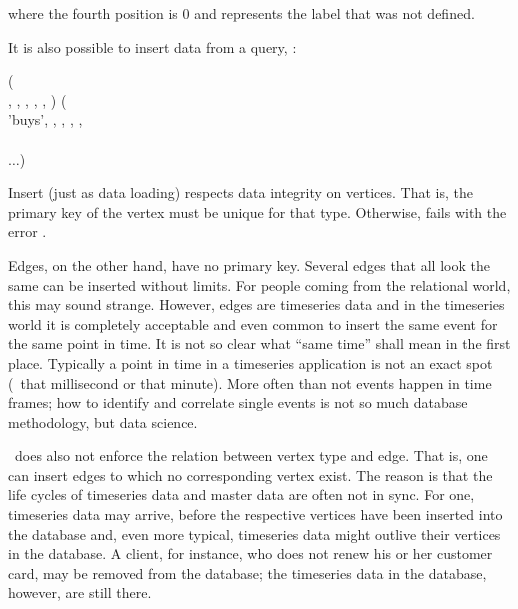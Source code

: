 where the fourth position is 0 and represents
the label that was not defined.

It is also possible  to insert data from
a query, \eg:

\begin{minipage}{\textwidth}
  ( \\
                      ,
                      ,
                      ,
                      ,
                      ,
                      ) (\\
\hspace*{0.2cm} 'buys', , 
                         ,
                         ,
                         ,
                          \\
\hspace*{0.35cm}  \\
\hspace*{0.2cm} $\dots$)
\end{minipage}

Insert (just as data loading) respects data integrity
on vertices. That is, the primary key of the vertex
must be unique for that type. Otherwise, 
fails with the error .

Edges, on the other hand, have no primary key.
Several edges that all look the same can be inserted
without limits. For people coming from the relational
world, this may sound strange. However, edges are
timeseries data and in the timeseries world
it is completely acceptable and
even common to insert the same event for the same
point in time. It is not so clear 
what ``same time'' shall mean in the first place.
Typically a point in time in a timeseries application
is not an exact spot (\eg\ that millisecond or that
minute). More often than not events happen in
time frames; how to identify and correlate single events
is not so much database methodology, but data science.

\nowdb\ does also not enforce the relation between
vertex type and edge. That is, one can insert edges
to which no corresponding vertex exist.
The reason is that the life cycles of timeseries data
and master data are often not in sync.
For one, timeseries data may arrive, before the
respective vertices have been inserted into the database
and, even more typical, timeseries data might
outlive their vertices in the database.
A client, for instance, who does not renew his or her
customer card, may be removed from the database;
the timeseries data in the database, however,
are still there.

